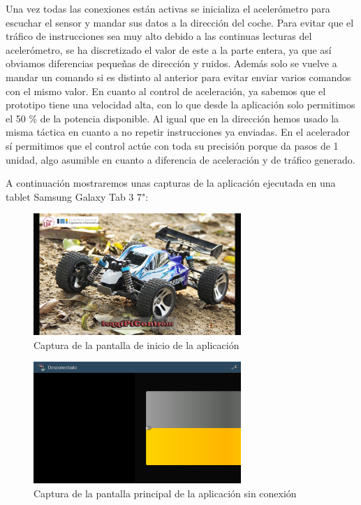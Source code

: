 \documentclass{pclass}
\begin{document}
\begin{itemize}
\begin{itemize}
	Una vez todas las conexiones están activas se inicializa el acelerómetro para escuchar el sensor y mandar sus datos a la dirección del coche. Para evitar que el tráfico de instrucciones sea muy alto debido a las continuas lecturas del acelerómetro, se ha discretizado el valor de este a la parte entera, ya que así obviamos diferencias pequeñas de dirección y ruidos. Además solo se vuelve a mandar un comando si es distinto al anterior para evitar enviar varios comandos con el mismo valor. En cuanto al control de aceleración, ya sabemos que el prototipo tiene una velocidad alta, con lo que desde la aplicación solo permitimos el 50 \%  de la potencia disponible. Al igual que en la dirección hemos usado la misma táctica en cuanto a no repetir instrucciones ya enviadas. En el acelerador sí permitimos que el control actúe con toda su precisión porque da pasos de 1 unidad, algo asumible en cuanto a diferencia de aceleración y de tráfico generado.
	
	A continuación mostraremos unas capturas de la aplicación ejecutada en una tablet Samsung Galaxy Tab 3 7":
	
	\begin{figure}[H]
		\centering
		\includegraphics[width=0.7\textwidth]{img/inicio}
		\caption{Captura de la pantalla de inicio de la aplicación}
		\label{fig:capturaInicio}
	\end{figure}

	\begin{figure}[H]
		\centering
		\includegraphics[width=0.7\textwidth]{img/sin_conexion}
		\caption{Captura de la pantalla principal de la aplicación sin conexión}
		\label{fig:capturaSinConexion}
	\end{figure}


\end{itemize}
\end{itemize}
\end{document}
